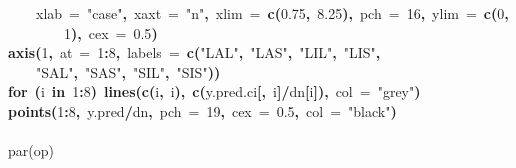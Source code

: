 \documentclass{article}
\makeatletter
\newcommand{\hlnumber}[1]{\textcolor[rgb]{0,0,0}{#1}}%
\newcommand{\hlfunctioncall}[1]{\textcolor[rgb]{.5,0,.33}{\textbf{#1}}}%
\newcommand{\hlstring}[1]{\textcolor[rgb]{.6,.6,1}{#1}}%
\newcommand{\hlkeyword}[1]{\textbf{#1}}%
\newcommand{\hlargument}[1]{\textcolor[rgb]{.69,.25,.02}{#1}}%
\newcommand{\hlcomment}[1]{\textcolor[rgb]{.18,.6,.34}{#1}}%
\newcommand{\hlsymbol}[1]{#1}%
\newcommand{\hlstd}[1]{\textcolor[rgb]{0,0,0}{#1}}%
\newenvironment{kframe}{%
 \def\FrameCommand##1{\hskip\@totalleftmargin \hskip-\fboxsep
 \colorbox{shadecolor}{##1}\hskip-\fboxsep
     \hskip-\linewidth \hskip-\@totalleftmargin \hskip\columnwidth}%
 \MakeFramed {\advance\hsize-\width
   \@totalleftmargin\z@ \linewidth\hsize
   \@setminipage}}%
 {\par\unskip\endMakeFramed}
\newenvironment{knitrout}{}{} %
\makeatother
\begin{document}
\begin{knitrout}
{\begin{kframe}
\begin{flushleft}
\hlstd{}{\ }{\ }{\ }{\ }\hlargument{xlab}{\ }\hlargument{=}{\ }\hlstring{"{}case"{}}\hlkeyword{,}{\ }\hlargument{xaxt}{\ }\hlargument{=}{\ }\hlstring{"{}n"{}}\hlkeyword{,}{\ }\hlargument{xlim}{\ }\hlargument{=}{\ }\hlfunctioncall{c}\hlkeyword{(}\hlnumber{0.75}\hlkeyword{,}{\ }\hlnumber{8.25}\hlkeyword{)}\hlkeyword{,}{\ }\hlargument{pch}{\ }\hlargument{=}{\ }\hlnumber{16}\hlkeyword{,}{\ }\hlargument{ylim}{\ }\hlargument{=}{\ }\hlfunctioncall{c}\hlkeyword{(}\hlnumber{0}\hlkeyword{,}\hspace*{\fill}\\
\hlstd{}{\ }{\ }{\ }{\ }{\ }{\ }{\ }{\ }\hlnumber{1}\hlkeyword{)}\hlkeyword{,}{\ }\hlargument{cex}{\ }\hlargument{=}{\ }\hlnumber{0.5}\hlkeyword{)}\hspace*{\fill}\\
\hlstd{}\hlfunctioncall{axis}\hlkeyword{(}\hlnumber{1}\hlkeyword{,}{\ }\hlargument{at}{\ }\hlargument{=}{\ }\hlnumber{1}\hlkeyword{:}\hlnumber{8}\hlkeyword{,}{\ }\hlargument{labels}{\ }\hlargument{=}{\ }\hlfunctioncall{c}\hlkeyword{(}\hlstring{"{}LAL"{}}\hlkeyword{,}{\ }\hlstring{"{}LAS"{}}\hlkeyword{,}{\ }\hlstring{"{}LIL"{}}\hlkeyword{,}{\ }\hlstring{"{}LIS"{}}\hlkeyword{,}\hspace*{\fill}\\
\hlstd{}{\ }{\ }{\ }{\ }\hlstring{"{}SAL"{}}\hlkeyword{,}{\ }\hlstring{"{}SAS"{}}\hlkeyword{,}{\ }\hlstring{"{}SIL"{}}\hlkeyword{,}{\ }\hlstring{"{}SIS"{}}\hlkeyword{)}\hlkeyword{)}\hspace*{\fill}\\
\hlstd{}\hlkeyword{for}{\ }\hlkeyword{(}\hlsymbol{i}{\ }\hlkeyword{in}{\ }\hlnumber{1}\hlkeyword{:}\hlnumber{8}\hlkeyword{)}{\ }\hlfunctioncall{lines}\hlkeyword{(}\hlfunctioncall{c}\hlkeyword{(}\hlsymbol{i}\hlkeyword{,}{\ }\hlsymbol{i}\hlkeyword{)}\hlkeyword{,}{\ }\hlfunctioncall{c}\hlkeyword{(}\hlsymbol{y.pred.ci}\hlkeyword{[}\hlkeyword{,}{\ }\hlsymbol{i}\hlkeyword{]}\hlkeyword{/}\hlsymbol{d}\hlkeyword{\usebox{\hlnormalsizeboxdollar}}\hlsymbol{n}\hlkeyword{[}\hlsymbol{i}\hlkeyword{]}\hlkeyword{)}\hlkeyword{,}{\ }\hlargument{col}{\ }\hlargument{=}{\ }\hlstring{"{}grey"{}}\hlkeyword{)}\hspace*{\fill}\\
\hlstd{}\hlfunctioncall{points}\hlkeyword{(}\hlnumber{1}\hlkeyword{:}\hlnumber{8}\hlkeyword{,}{\ }\hlsymbol{y.pred}\hlkeyword{/}\hlsymbol{d}\hlkeyword{\usebox{\hlnormalsizeboxdollar}}\hlsymbol{n}\hlkeyword{,}{\ }\hlargument{pch}{\ }\hlargument{=}{\ }\hlnumber{19}\hlkeyword{,}{\ }\hlargument{cex}{\ }\hlargument{=}{\ }\hlnumber{0.5}\hlkeyword{,}{\ }\hlargument{col}{\ }\hlargument{=}{\ }\hlstring{"{}black"{}}\hlkeyword{)}\hspace*{\fill}\\
\hlstd{}\hspace*{\fill}\\
\hlstd{}\hlcomment{\usebox{\hlnormalsizeboxhash}par(op)}\mbox{}
\normalfont
\end{flushleft}



\end{kframe}}
\end{knitrout}
\end{document}
